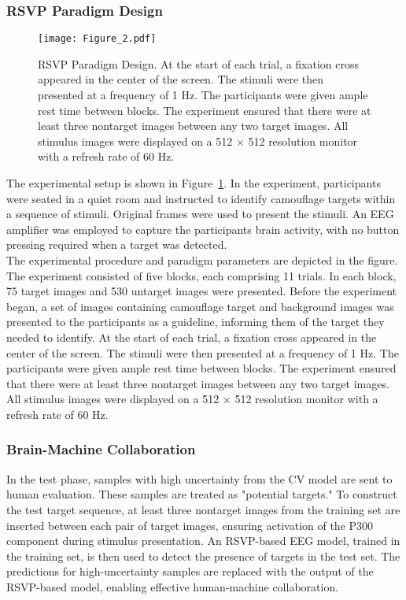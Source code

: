 \documentclass[preprint,12pt,authoryear]{elsarticle}
\begin{document}
\subsubsection{RSVP Paradigm Design}
\begin{figure}[ht]
    \centering
    \texttt{[image: Figure\_2.pdf]} %
    \caption{RSVP Paradigm Design. At the start of each trial, a fixation
cross appeared in the center of the screen. The stimuli were then presented
at a frequency of 1 Hz. The participants were given ample rest time between
blocks. The experiment ensured that there were at least three nontarget
images between any two target images. All stimulus images were displayed
on a 512 × 512 resolution monitor with a refresh rate of 60 Hz.}
    \label{fig:RSVP}
\end{figure}
The experimental setup is shown in Figure~\ref{fig:RSVP}. In the experiment,
participants were seated in a quiet room and instructed to identify
camouflage targets within a sequence of stimuli. Original frames
were used to present the stimuli. An EEG amplifier was employed to
capture the participants\textquotesingle{} brain activity, with no
button pressing required when a target was detected.\\
The experimental procedure and paradigm parameters are depicted in the
figure. The experiment consisted of five blocks, each comprising 11 trials.
In each block, 75 target images and 530 untarget images were presented. Before the experiment began, a set
of images containing camouflage target and background images was
presented to the participants as a guideline, informing them of the
target they needed to identify. At the start of each trial, a fixation
cross appeared in the center of the screen. The stimuli were then presented
at a frequency of 1 Hz. The participants were given ample rest time between
blocks. The experiment ensured that there were at least three nontarget
images between any two target images. All stimulus images were displayed
on a 512 × 512 resolution monitor with a refresh rate of 60 Hz.

\subsubsection{Brain-Machine Collaboration}
In the test phase, samples with high uncertainty from the CV model are sent to human evaluation. These samples are treated as "potential targets." To construct the test target sequence, at least three nontarget images from the training set are inserted between each pair of target images, ensuring activation of the P300 component during stimulus presentation. An RSVP-based EEG model, trained in the training set, is then used to detect the presence of targets in the test set. The predictions for high-uncertainty samples are replaced with the output of the RSVP-based model, enabling effective human-machine collaboration.
\end{document}
